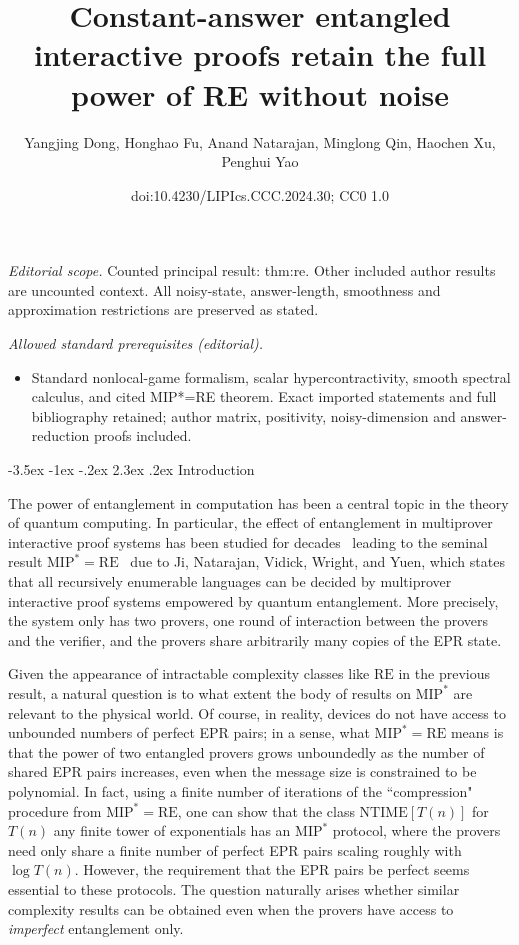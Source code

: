\documentclass[10pt,a4paper]{article}
\title{Constant-answer entangled interactive proofs retain the full power of RE without noise}
\author{Yangjing Dong, Honghao Fu, Anand Natarajan, Minglong Qin, Haochen Xu, Penghui Yao}
\date{doi:10.4230/LIPIcs.CCC.2024.30; CC0 1.0}
\makeatletter
\renewcommand{\section}{\@startsection {section}{1}{\z@}%
             {-3.5ex \@plus -1ex \@minus -.2ex}%
             {2.3ex \@plus .2ex}%
             {\normalfont\Large\scshape\bfseries}}
\theoremstyle{plain}
\theoremstyle{definition}
\newcommand{\1}{\mathbb{1}} %
\newcommand{\MIP}{\mathrm{MIP}}
\newcommand{\RE}{\mathrm{RE}}
\makeatother
\begin{document}
\maketitle
\noindent\textit{Editorial scope.} Counted principal result: thm:re. Other included author results are uncounted context. All noisy-state, answer-length, smoothness and approximation restrictions are preserved as stated.\par\medskip
\noindent\textit{Allowed standard prerequisites (editorial).}\begin{itemize}
\item Standard nonlocal-game formalism, scalar hypercontractivity, smooth spectral calculus, and cited MIP*=RE theorem. Exact imported statements and full bibliography retained; author matrix, positivity, noisy-dimension and answer-reduction proofs included.
\end{itemize}\medskip
 \section{Introduction}

The power of entanglement in computation has been a central topic in the theory of quantum computing. In particular, the effect of entanglement in multiprover interactive proof systems has been studied for decades~\cite{doi:10.1137/090772885,doi:10.1137/090751293,Ito:2009:OTO:1602931.1603187,Ji:2017:CQM:3055399.3055441,Slo:2020,slofstra:2019}  leading to the seminal result $\mathrm{MIP}^*=\mathrm{RE}$~\cite{JNVWYuen'20,JNVWY'20} due to Ji, Natarajan, Vidick, Wright, and Yuen, which states that all recursively enumerable languages can be decided by multiprover interactive proof systems empowered by quantum entanglement. More precisely, the system only has two provers, one round of interaction between the provers and the verifier, and the provers share arbitrarily many copies of the EPR state.



Given the appearance of intractable complexity classes like $\RE$ in the previous result, a natural question is to what extent the body of results on $\MIP^*$ are relevant to the physical world. Of course, in reality, devices do not have access to unbounded numbers of perfect EPR pairs; in a sense, what $\MIP^* = \RE$ means is that the power of two entangled provers grows unboundedly as the number of shared EPR pairs increases, even when the message size is constrained to be polynomial. In fact, using a finite number of iterations of the ``compression" procedure from $\MIP^* = \RE$, one can show that the class $\mathrm{NTIME}[T(n)]$ for $T(n)$ any finite tower of exponentials has an $\MIP^*$ protocol, where the provers need only share a finite number of perfect EPR pairs scaling roughly with $\log T(n)$. However, the requirement that the EPR pairs be perfect seems essential to these protocols. The question naturally arises whether similar complexity results can be obtained even when the provers have access to \emph{imperfect} entanglement only.
\end{document}

